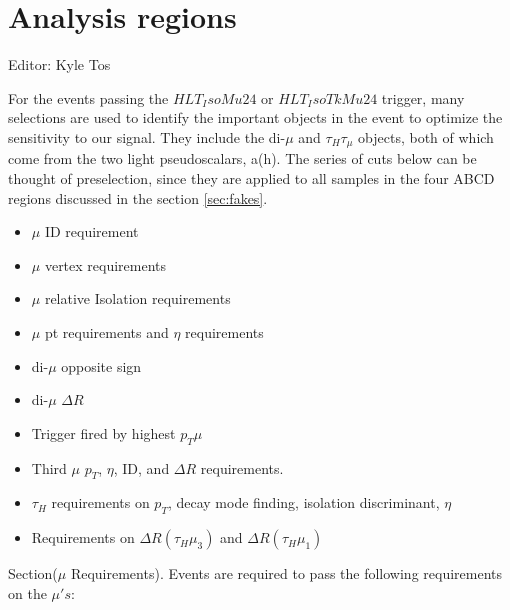 \section{Analysis regions\label{sec:analysisregions}}
Editor: Kyle Tos

For the events passing the $HLT_IsoMu24$ or $HLT_IsoTkMu24$ trigger, many selections are used to identify the important objects in the event to optimize the sensitivity to our signal. They include the di-$\mu$ and $\tau_{H}\tau_{\mu}$ objects, both of which come from the two light pseudoscalars, a(h). The series of cuts below can be thought of preselection, since they are applied to all samples in the four ABCD regions discussed in the section \ref{sec:fakes}. 

\begin{itemize}
  \item $\mu$ ID requirement
  \item $\mu$ vertex requirements
  \item $\mu$ relative Isolation requirements
  \item $\mu$ pt requirements and $\eta$ requirements
  \item di-$\mu$ opposite sign
  \item di-$\mu$ $\Delta R$
  \item Trigger fired by highest $p_{T} \mu$
  \item Third $\mu$ $p_{T}$, $\eta$, ID, and $\Delta R$ requirements.
  \item $\tau_{H}$ requirements on $p_{T}$, decay mode finding, isolation discriminant, $\eta$
  \item Requirements on $\Delta R (\tau_{H}\mu_{3})$ and $\Delta R (\tau_{H}\mu_{1})$
\end{itemize}


Section($\mu$ Requirements). Events are required to pass the following requirements on the $\mu's$:

